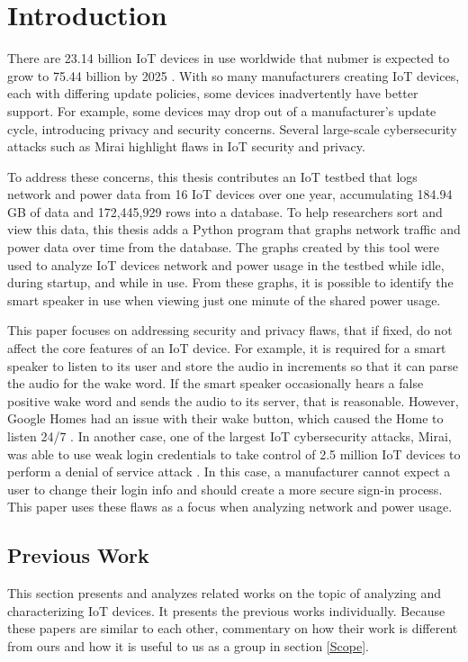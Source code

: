 \chapter{Introduction}
\label{Introduction}
There are 23.14 billion IoT devices in use worldwide that nubmer is expected to grow to 75.44 billion by 2025 \cite{statista_2016}. With so many manufacturers creating IoT devices, each with differing update policies, some devices inadvertently have better support. For example, some devices may drop out of a manufacturer's update cycle, introducing privacy and security concerns. Several large-scale cybersecurity attacks such as Mirai \cite{iotforall_2017} highlight flaws in IoT security and privacy.

To address these concerns, this thesis contributes an IoT testbed that logs network and power data from 16 IoT devices over one year, accumulating 184.94 GB of data and 172,445,929 rows into a database. To help researchers sort and view this data, this thesis adds a Python program that graphs network traffic and power data over time from the database. The graphs created by this tool were used to analyze IoT devices network and power usage in the testbed while idle, during startup, and while in use. From these graphs, it is possible to identify the smart speaker in use when viewing just one minute of the shared power usage.

This paper focuses on addressing security and privacy flaws, that if fixed, do not affect the core features of an IoT device. For example, it is required for a smart speaker to listen to its user and store the audio in increments so that it can parse the audio for the wake word. If the smart speaker occasionally hears a false positive wake word and sends the audio to its server, that is reasonable. However, Google Homes had an issue with their wake button, which caused the Home to listen 24/7 \cite{burke_2017}. In another case, one of the largest IoT cybersecurity attacks, Mirai, was able to use weak login credentials to take control of 2.5 million IoT devices to perform a denial of service attack \cite{whittaker_2017}. In this case, a manufacturer cannot expect a user to change their login info and should create a more secure sign-in process. This paper uses these flaws as a focus when analyzing network and power usage.

\section{Previous Work}
This section presents and analyzes related works on the topic of analyzing and characterizing IoT devices. It presents the previous works individually. Because these papers are similar to each other, commentary on how their work is different from ours and how it is useful to us as a group in section \ref{Scope}.

